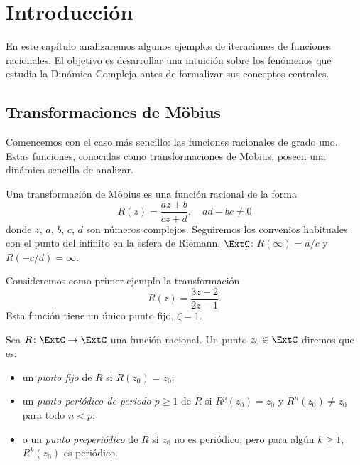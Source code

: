 \chapter{Introducción}
En este capítulo analizaremos algunos ejemplos de iteraciones de funciones
racionales. El objetivo es desarrollar una intuición sobre los fenómenos que
estudia la Dinámica Compleja antes de formalizar sus conceptos centrales.

\section{Transformaciones de Möbius}
Comencemos con el caso más sencillo: las funciones racionales de grado uno.
Estas funciones, conocidas como transformaciones de Möbius, poseen una dinámica
sencilla de analizar.

\begin{definicion}
    Una transformación de Möbius es una función racional de la forma
    \[
        R(z) = \frac{az+b}{cz+d}, \quad ad-bc \ne 0
    \] 
    donde $z$, $a$, $b$, $c$, $d$ son números complejos. Seguiremos los
    convenios habituales con el punto del infinito en la esfera de Riemann,
    $\ExtC$: $R(\infty)=a/c$ y $R(-c/d) = \infty$.
\end{definicion}

Consideremos como primer ejemplo la transformación
\begin{equation}\label{eq:mobius_ej1}
    R(z) = \frac{3z-2}{2z-1}.
\end{equation}
Esta función tiene un único punto fijo, $\zeta = 1$.

\begin{definicion}
    Sea $R \colon \ExtC \to \ExtC$ una función racional. Un punto $z_0 \in
    \ExtC$ diremos que es:
    \begin{itemize}
        \item un \emph{punto fijo} de $R$ si $R(z_0) = z_0$;
        \item un \emph{punto periódico de periodo $p \geq 1$} de $R$ si
        $R^p(z_0) = z_0$ y $R^n(z_0) \neq z_0$ para todo $n < p$;
        \item o un \emph{punto preperiódico} de $R$ si $z_0$ no es periódico,
        pero para algún $k \geq 1$, $R^k(z_0)$ es periódico.
    \end{itemize}
\end{definicion}


